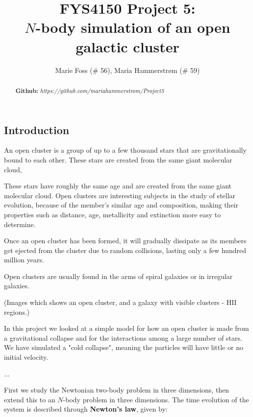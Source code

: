 \documentclass{article}
\title{\textbf{FYS4150 Project 5: \\$N$-body simulation of an open galactic cluster}}
\author{Marie Foss (\# 56), Maria Hammerstr{{\o}}m (\# 59)}
\date{}
\begin{document}
\maketitle

\begin{abstract}
	\noindent \lipsum[1]
	\vspace*{2ex}
	
	\noindent \textbf{Github:} \textit{https://github.com/mariahammerstrom/Project5}
	\vspace*{2ex}
\end{abstract}



\begin{multicols}{2}

\section{Introduction}

An open cluster is a group of up to a few thousand stars that are gravitationally bound to each other. These stars are created from the same giant molecular cloud, 

These stars have roughly the same age and are created from the same giant molecular cloud. Open clusters are interesting subjects in the study of stellar evolution, because of the member's similar age and composition, making their properties such as distance, age, metallicity and extinction more easy to determine. 

Once an open cluster has been formed, it will gradually dissipate as its members get ejected from the cluster due to random collisions, lasting only a few hundred million years.

Open clusters are usually found in the arms of spiral galaxies or in irregular galaxies. 

(Images which shows an open cluster, and a galaxy with visible clusters - HII regions.)

In this project we looked at a simple model for how an open cluster is made from a gravitational collapse and for the interactions among a large number of stars. We have simulated a "cold collapse", meaning the particles will have little or no initial velocity.

...

First we study the Newtonian two-body problem in three dimensions, then extend this to an $N$-body problem in three dimensions. The time evolution of the system is described through \textbf{Newton's law}, given by:


\end{multicols}
\end{document}
